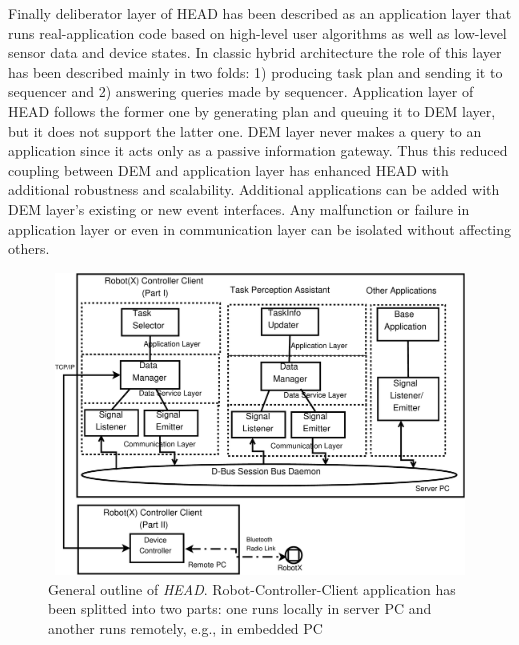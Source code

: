 \documentclass{ifacconf}
\begin{document}
Finally deliberator layer of HEAD has been described as an application layer that runs real-application code based on high-level user algorithms as well as low-level sensor data and device states. In classic hybrid architecture the role of this layer has been described mainly in two folds: 1) producing task plan and sending it to sequencer and 2) answering queries made by sequencer. Application layer of HEAD follows the former one by generating plan and queuing it to DEM layer, but it does not support the latter one. DEM layer never makes a query to an application since it acts only as a passive information gateway. Thus this reduced coupling between DEM and application layer has enhanced HEAD with additional robustness and scalability. Additional applications can be added with DEM layer's existing or new event interfaces. Any malfunction or failure in application layer or even in communication layer can be isolated without affecting others. 
\begin{figure}
\begin{center}
\includegraphics[width=12cm,height=8cm]{./dia-files/concrete-arch}    %
\caption{General outline of {\em HEAD}. Robot-Controller-Client application has been splitted into two parts: one runs locally in server PC and another runs remotely, e.g., in embedded PC} 
\label{fig:abstract-arch}
\end{center}
\end{figure}


\end{document}
